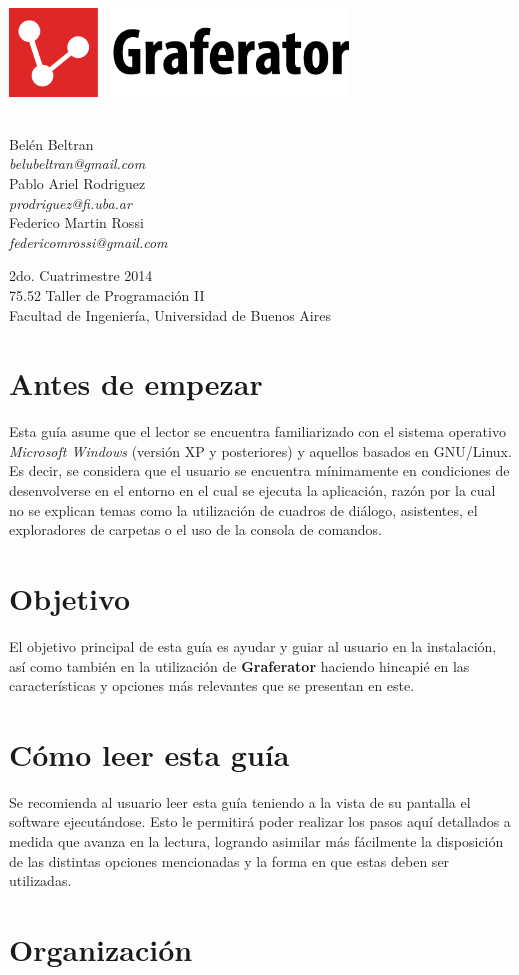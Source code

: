 \documentclass{book}
\makeatletter
\newcommand*{\titleGM}{\begingroup %
\newcommand*{\sepline}{\color{gray85}\rule[0.5ex]{30em}{0.55pt}}
	
	





    	


\begin{center}

	\vspace*{1.5cm} 
	
	\includegraphics[width=9cm]{images/graferator-logo.png} \\[12\baselineskip]

	
	\colorbox{gray95}{
		\parbox[t]{1.0\linewidth}{
			\vspace*{0.7cm} %
			
			\centering {\Huge\bfseries\color{gray50}\fontfamily{fvs}\selectfont Guía de usuario}\par %
			
			\vspace*{0.7cm} %
		}
	}\\[10\baselineskip]


		\Large Belén Beltran \\
		\large \textit{belubeltran@gmail.com} \\ \medskip
		\Large Pablo Ariel Rodriguez \\
		\large \textit{prodriguez@fi.uba.ar} \\ \medskip
		\Large Federico Martin Rossi \\ 
		\large \textit{federicomrossi@gmail.com} \\

		\bigskip\bigskip\bigskip\bigskip

		\large 2do. Cuatrimestre 2014 \\ \smallskip
		\large 75.52 Taller de Programación II \\ \smallskip
		\large Facultad de Ingeniería, Universidad de Buenos Aires \\ \smallskip

\end{center}

\endgroup}
\makeatother
\begin{document}

\thispagestyle{empty}


\titleGM



%
%
\section*{\bfseries\color{black}Antes de empezar}

Esta guía asume que el lector se encuentra familiarizado con el sistema operativo \textit{Microsoft Windows} (versión XP y posteriores) y aquellos basados en GNU/Linux. Es decir, se considera que el usuario se encuentra mínimamente en condiciones de desenvolverse en el entorno en el cual se ejecuta la aplicación, razón por la cual no se explican temas como la utilización de cuadros de diálogo, asistentes, el exploradores de carpetas o el uso de la consola de comandos.
\bigskip


\section*{Objetivo}

El objetivo principal de esta guía es ayudar y guiar al usuario en la instalación, así como también en la utilización de \textbf{Graferator} haciendo hincapié en las características y opciones más relevantes que se presentan en este. 
\bigskip


\section*{\bfseries\color{black}Cómo leer esta guía}

Se recomienda al usuario leer esta guía teniendo a la vista de su pantalla el software ejecutándose. Esto le permitirá poder realizar los pasos aquí detallados a medida que avanza en la lectura, logrando asimilar más fácilmente la disposición de las distintas opciones mencionadas y la forma en que estas deben ser utilizadas.
\bigskip


\section*{\bfseries\color{black}Organización}
\end{document}
